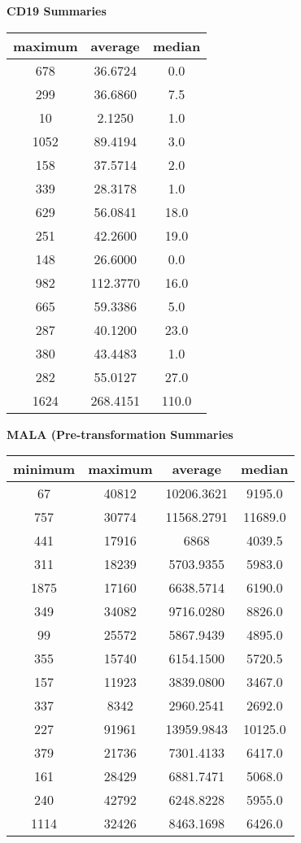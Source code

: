 \documentclass{article}
\begin{document}
\vspace{25pt}

\textbf{\large{CD19 Summaries}}

\vspace{5pt}

\begin{tabular}{|c|c|c|}
\hline
maximum & average & median \\
\hline
678 & 36.6724 & 0.0 \\
\hline
299 & 36.6860 & 7.5 \\
\hline
10 & 2.1250 & 1.0 \\
\hline
1052 & 89.4194 & 3.0 \\
\hline
158 & 37.5714 & 2.0 \\
\hline
339 & 28.3178 & 1.0 \\
\hline
629 & 56.0841 & 18.0 \\
\hline
251 & 42.2600 & 19.0 \\
\hline
148 & 26.6000 & 0.0 \\
\hline
982 & 112.3770 & 16.0 \\
\hline
665 & 59.3386 & 5.0 \\
\hline
287 & 40.1200 & 23.0 \\
\hline
380 & 43.4483 & 1.0 \\
\hline
282 & 55.0127 & 27.0 \\
\hline
1624 & 268.4151 & 110.0 \\
\hline
\end{tabular}


\vspace{25pt}

\textbf{\large{MALA (Pre-transformation Summaries}}

\vspace{5pt}

\begin{tabular}{|c|c|c|c|}
\hline
minimum & maximum & average & median \\
\hline
67 & 40812 & 10206.3621 & 9195.0 \\
\hline
757 & 30774 & 11568.2791 & 11689.0 \\
\hline
441 & 17916 & 6868 & 4039.5 \\
\hline
311 & 18239 & 5703.9355 & 5983.0 \\
\hline
1875 & 17160 & 6638.5714 & 6190.0 \\
\hline
349 & 34082 & 9716.0280 & 8826.0 \\
\hline
99 & 25572 & 5867.9439 & 4895.0 \\
\hline
355 & 15740 & 6154.1500 & 5720.5 \\
\hline
157 & 11923 & 3839.0800 & 3467.0 \\
\hline
337 & 8342 & 2960.2541 & 2692.0 \\
\hline
227 & 91961 & 13959.9843 & 10125.0 \\
\hline
379 & 21736 & 7301.4133 & 6417.0 \\
\hline
161 & 28429 & 6881.7471 & 5068.0 \\
\hline
240 & 42792 & 6248.8228 & 5955.0 \\
\hline
1114 & 32426 & 8463.1698 & 6426.0 \\
\hline
\end{tabular}
\end{document}
